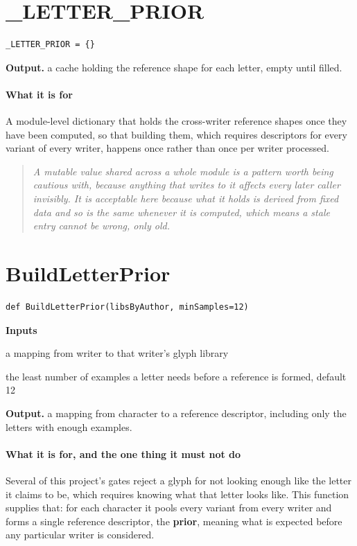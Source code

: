 \section{\_LETTER\_PRIOR}
\begin{lstlisting}[style=sig]
_LETTER_PRIOR = {}
\end{lstlisting}

\noindent\textbf{Output.} a cache holding the reference shape for each letter, empty until filled.


\paragraph{What it is for}
A module-level dictionary that holds the cross-writer reference shapes once they have been computed, so that building them, which requires descriptors for every variant of every writer, happens once rather than once per writer processed.


\begin{quote}\small\itshape A mutable value shared across a whole module is a pattern worth being cautious with, because anything that writes to it affects every later caller invisibly. It is acceptable here because what it holds is derived from fixed data and so is the same whenever it is computed, which means a stale entry cannot be wrong, only old.\end{quote}

\section{BuildLetterPrior}
\begin{lstlisting}[style=sig]
def BuildLetterPrior(libsByAuthor, minSamples=12)
\end{lstlisting}

\noindent\textbf{Inputs}
\begin{description}[leftmargin=2.2em,style=nextline,font=\normalfont\ttfamily]\setlength\itemsep{1pt}
  \item[{libsByAuthor}] \normalfont a mapping from writer to that writer's glyph library
  \item[{minSamples}] \normalfont the least number of examples a letter needs before a reference is formed, default 12
\end{description}

\noindent\textbf{Output.} a mapping from character to a reference descriptor, including only the letters with enough examples.


\paragraph{What it is for, and the one thing it must not do}
Several of this project's gates reject a glyph for not looking enough like the letter it claims to be, which requires knowing what that letter looks like. This function supplies that: for each character it pools every variant from every writer and forms a single reference descriptor, the \textbf{prior}, meaning what is expected before any particular writer is considered.

